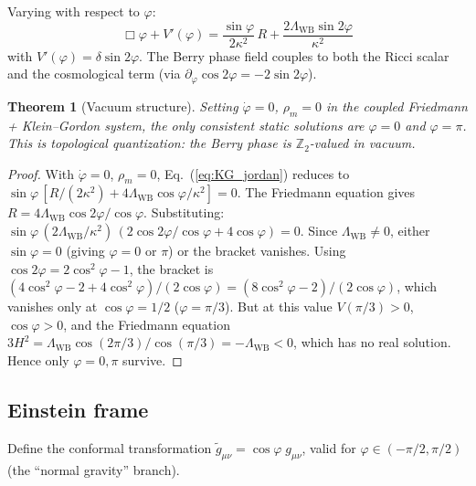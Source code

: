 \documentclass[aps,prd,twocolumn,superscriptaddress,nofootinbib]{revtex4-2}
\newcommand{\Lw}{\Lambda_{\mathrm{WB}}}
\newtheorem{theorem}{Theorem}
\begin{document}
Varying with respect to $\varphi$:
\begin{equation}
  \boxed{\;
  \Box\varphi + V'(\varphi)
  = \frac{\sin\varphi}{2\kappa^2}\,R
  + \frac{2\Lw\sin 2\varphi}{\kappa^2}
  \;}
  \label{eq:KG_jordan}
\end{equation}
with $V'(\varphi) = \delta\sin 2\varphi$.
The Berry phase field couples to both the Ricci scalar
and the cosmological term (via $\partial_\varphi\cos 2\varphi
= -2\sin 2\varphi$).

\begin{theorem}[Vacuum structure]
\label{thm:vacuum}
Setting $\dot\varphi = 0$, $\rho_m = 0$ in the coupled
Friedmann + Klein--Gordon system, the only consistent
static solutions are $\varphi = 0$ and $\varphi = \pi$.
This is topological quantization: the Berry phase is
$\mathbb{Z}_2$-valued in vacuum.
\end{theorem}
\begin{proof}
With $\dot\varphi = 0$, $\rho_m = 0$,
Eq.~(\ref{eq:KG_jordan}) reduces to
$\sin\varphi\,[R/(2\kappa^2) + 4\Lw\cos\varphi/\kappa^2] = 0$.
The Friedmann equation gives $R = 4\Lw\cos 2\varphi/\cos\varphi$.
Substituting: $\sin\varphi\,(2\Lw/\kappa^2)\,(2\cos 2\varphi/\cos\varphi + 4\cos\varphi) = 0$.
Since $\Lw \neq 0$, either $\sin\varphi = 0$
(giving $\varphi = 0$ or $\pi$) or the bracket vanishes.
Using $\cos 2\varphi = 2\cos^2\varphi - 1$, the bracket is
$(4\cos^2\varphi - 2 + 4\cos^2\varphi)/(2\cos\varphi)
= (8\cos^2\varphi - 2)/(2\cos\varphi)$, which vanishes only
at $\cos\varphi = 1/2$ ($\varphi = \pi/3$).
But at this value $V(\pi/3) > 0$, $\cos\varphi > 0$,
and the Friedmann equation
$3H^2 = \Lw\cos(2\pi/3)/\cos(\pi/3) = -\Lw < 0$,
which has no real solution.  Hence only $\varphi = 0, \pi$ survive.
\end{proof}

\subsection{Einstein frame}
\label{sec:einstein_frame}

Define the conformal transformation
$\tilde{g}_{\mu\nu} = \cos\varphi\;g_{\mu\nu}$,
valid for $\varphi \in (-\pi/2, \pi/2)$
(the ``normal gravity'' branch).
\end{document}
